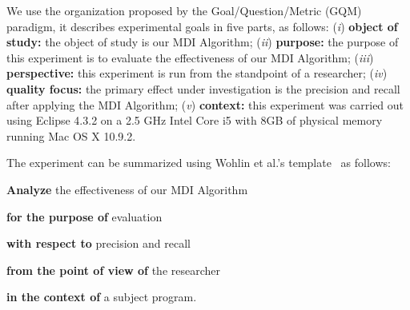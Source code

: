 We use the organization proposed by the Goal/Question/Metric (GQM) paradigm, it describes experimental goals in five parts, as follows:
%
%
%
%
%
%
%
(\textit{i}) \textbf{object of study:} the object of study is our MDI Algorithm; (\textit{ii}) \textbf{purpose:} the purpose of this experiment is to evaluate the effectiveness of our MDI Algorithm; (\textit{iii}) \textbf{perspective:} this experiment is run from the standpoint of a researcher; (\textit{iv}) \textbf{quality focus:} the primary effect under investigation is the precision and recall after applying the MDI Algorithm; (\textit{v}) \textbf{context:} this experiment was carried out using Eclipse 4.3.2 on a 2.5 GHz Intel Core i5 with 8GB of physical memory running Mac OS X 10.9.2.

The experiment can be summarized using Wohlin et al.'s template~\cite{Wohlin} as follows: 

\textbf{Analyze} the effectiveness of our MDI Algorithm

\textbf{for the purpose of} evaluation

\textbf{with respect to} precision and recall

\textbf{from the point of view of} the researcher

\textbf{in the context of} a subject program. 


